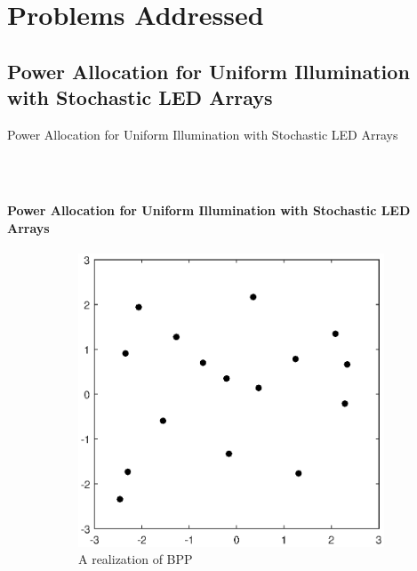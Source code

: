 \documentclass{beamer}
\theoremstyle{remark}
\begin{document}
\section{Problems Addressed}
\subsection{Power Allocation for Uniform Illumination with Stochastic LED Arrays}

\begin{frame}
\vfill
Power Allocation for Uniform Illumination with Stochastic LED Arrays
\vfill
\end{frame}
\begin{frame}
\frametitle{\,}
\framesubtitle{Power Allocation for Uniform Illumination with
Stochastic LED Arrays}
\begin{figure}[t!]
    \centering
    \begin{subfigure}[t]{0.5\columnwidth}
        \centering
        \includegraphics[width=\columnwidth]{LedArrangementRandom}
        \caption{A realization of BPP}
\label{fig3:subfig1}        
    \end{subfigure}%
    ~ 
    \begin{subfigure}[t]{0.5\columnwidth}
        \centering

\end{subfigure}
\end{figure}
\end{frame}
\end{document}

